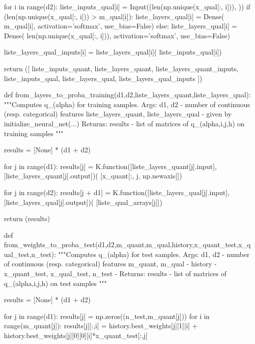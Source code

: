 \begin{pylisting}
        for i in range(d2):
            liste_inputs_qual[i] = Input((len(np.unique(x_qual[:, i])), ))
            if (len(np.unique(x_qual[:, i])) > m_qual[i]):
                liste_layers_qual[i] = Dense(
                m_qual[i], activation='softmax', use_bias=False)
            else:
                liste_layers_qual[i] = Dense(
                len(np.unique(x_qual[:, i])), activation='softmax', use_bias=False)

            liste_layers_qual_inputs[i] = liste_layers_qual[i](
                liste_inputs_qual[i])

        return ([
            liste_inputs_quant, liste_layers_quant, liste_layers_quant_inputs,
            liste_inputs_qual, liste_layers_qual, liste_layers_qual_inputs
        ])
    
    
    def from_layers_to_proba_training(d1,d2,liste_layers_quant,liste_layers_qual):
        """Computes q_(alpha) for training samples.
	    Args:
	       d1, d2 - number of continuous (resp. categorical) features
	       liste_layers_quant, liste_layers_qual - given by initialize_neural_net(...)
	    Returns:
			results - list of matrices of q_(alpha,i,j,h) on training samples
	    """

        results = [None] * (d1 + d2)

        for j in range(d1):
            results[j] = K.function([liste_layers_quant[j].input],
                                    [liste_layers_quant[j].output])(
                                        [x_quant[:, j, np.newaxis]])

        for j in range(d2):
            results[j + d1] = K.function([liste_layers_qual[j].input],
                                         [liste_layers_qual[j].output])(
                                             [liste_qual_arrays[j]])

        return (results)
    
    
    
    
    def from_weights_to_proba_test(d1,d2,m_quant,m_qual,history,x_quant_test,x_qual_test,n_test):
        """Computes q_(alpha) for test samples.
	    Args:
	       d1, d2 - number of continuous (resp. categorical) features
	       m_quant, m_qual - 
	       history - 
	       x_quant_test, x_qual_test, n_test - 
	    Returns:
			results - list of matrices of q_(alpha,i,j,h) on test samples
	    """
	    
        results = [None] * (d1 + d2)    

        for j in range(d1):
            results[j] = np.zeros((n_test,m_quant[j]))
            for i in range(m_quant[j]):
                results[j][:,i] = history.best_weights[j][1][i] + history.best_weights[j][0][0][i]*x_quant_test[:,j]



\end{pylisting}
